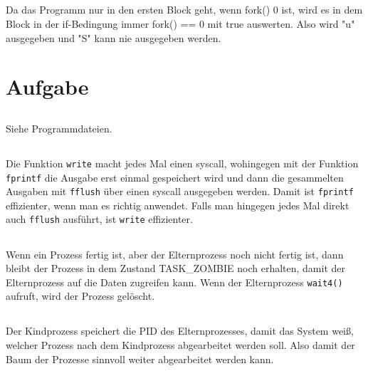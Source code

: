 \documentclass{scrartcl}
\begin{document}
\subsection{}
Da das Programm nur in den ersten Block geht, wenn fork() 0 ist, wird es in dem Block in der if-Bedingung immer fork() == 0 mit true auswerten. Also wird "u" ausgegeben und "S" kann nie ausgegeben werden.

\section{Aufgabe}

\subsection{}

Siehe Programmdateien.

\subsection{}

Die Funktion \texttt{write} macht jedes Mal einen syscall, wohingegen mit der Funktion \texttt{fprintf} die Ausgabe erst einmal gespeichert wird und dann die gesammelten Ausgaben mit \texttt{fflush} über einen syscall ausgegeben werden. Damit ist \texttt{fprintf} effizienter, wenn man es richtig anwendet. Falls man hingegen jedes Mal direkt auch \texttt{fflush} ausführt, ist \texttt{write} effizienter.

\subsection{}

Wenn ein Prozess fertig ist, aber der Elternprozess noch nicht fertig ist, dann bleibt der Prozess in dem Zustand TASK\_ZOMBIE noch erhalten, damit der Elternprozess auf die Daten zugreifen kann. Wenn der Elternprozess \texttt{wait4()} aufruft, wird der Prozess gelöscht.

\subsection{}

Der Kindprozess speichert die PID des Elternprozesses, damit das System weiß, welcher Prozess nach dem Kindprozess abgearbeitet werden soll. Also damit der Baum der Prozesse sinnvoll weiter abgearbeitet werden kann.
\end{document}
